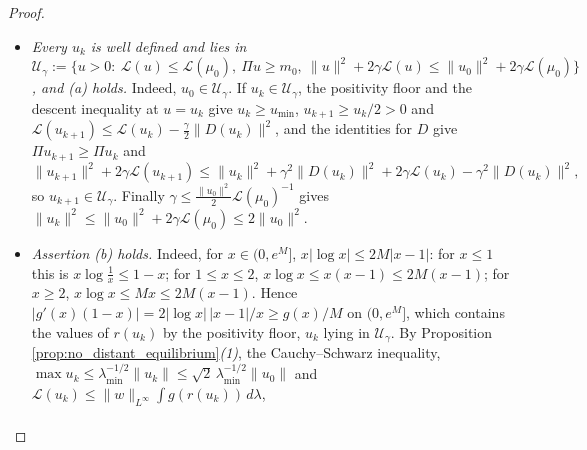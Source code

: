 \begin{proof}
\begin{itemize}
    \begin{equation*}
        f'(s)=\int w\,g'(r_s)\,\chi_s\,d\lambda,\qquad f''(s)=\int w\Bigl(g''(r_s)\,\chi_s^2-2g'(r_s)\,\frac{\chi_s\,v}{u_s}\Bigr)d\lambda,
    \end{equation*}
    and $f'(0)=\langle\psi(u),Pv-r(u)v\rangle=\langle D(u),v\rangle=-\|D(u)\|^2$. Now $|\chi_s|\leq2(P|v|+e^{M'}|v|)/u_{\min}$ pointwise and $\|P|v|\|\leq\|v\|$ by Lemma \ref{lem:adjoint}\emph{(3)}, so the triangle inequality gives $\|P|v|+e^{M'}|v|\|\leq(1+e^{M'})\|v\|$ and the Cauchy--Schwarz inequality gives $\int(P|v|+e^{M'}|v|)|v|\,d\lambda\leq(1+e^{M'})\|v\|^2$; therefore $|f''|\leq b_3\|D(u)\|^2$ on $[0,\gamma]$. Taylor's formula and $\gamma b_3\leq1$ give $\mathcal L(u^+)=f(\gamma)\leq\mathcal L(u)-\gamma\|D(u)\|^2+\frac{\gamma^2b_3}2\|D(u)\|^2\leq\mathcal L(u)-\frac\gamma2\|D(u)\|^2$, and $u^+=u_\gamma\geq u/2$.
    \item \emph{Every $u_k$ is well defined and lies in $\mathcal U_\gamma:=\bigl\{u>0:\ \mathcal L(u)\leq\mathcal L(\mu_0),\ \Pi u\geq m_0,\ \|u\|^2+2\gamma\mathcal L(u)\leq\|u_0\|^2+2\gamma\mathcal L(\mu_0)\bigr\}$, and \emph{(a)} holds.} Indeed, $u_0\in\mathcal U_\gamma$. If $u_k\in\mathcal U_\gamma$, the positivity floor and the descent inequality at $u=u_k$ give $u_k\geq u_{\min}$, $u_{k+1}\geq u_k/2>0$ and $\mathcal L(u_{k+1})\leq\mathcal L(u_k)-\frac\gamma2\|D(u_k)\|^2$, and the identities for $D$ give $\Pi u_{k+1}\geq\Pi u_k$ and
    \begin{equation*}
        \|u_{k+1}\|^2+2\gamma\mathcal L(u_{k+1})\leq\|u_k\|^2+\gamma^2\|D(u_k)\|^2+2\gamma\mathcal L(u_k)-\gamma^2\|D(u_k)\|^2,
    \end{equation*}
    so $u_{k+1}\in\mathcal U_\gamma$. Finally $\gamma\leq\frac{\|u_0\|^2}2\mathcal L(\mu_0)^{-1}$ gives $\|u_k\|^2\leq\|u_0\|^2+2\gamma\mathcal L(\mu_0)\leq2\|u_0\|^2$.
    \item \emph{Assertion \emph{(b)} holds.} Indeed, for $x\in(0,e^M]$, $x|\log x|\leq2M|x-1|$: for $x\leq1$ this is $x\log\frac1x\leq1-x$; for $1\leq x\leq2$, $x\log x\leq x(x-1)\leq2M(x-1)$; for $x\geq2$, $x\log x\leq Mx\leq2M(x-1)$. Hence $|g'(x)(1-x)|=2|\log x|\,|x-1|/x\geq g(x)/M$ on $(0,e^M]$, which contains the values of $r(u_k)$ by the positivity floor, $u_k$ lying in $\mathcal U_\gamma$. By Proposition \ref{prop:no_distant_equilibrium}\emph{(1)}, the Cauchy--Schwarz inequality, $\max u_k\leq\lambda_{\min}^{-1/2}\|u_k\|\leq\sqrt2\,\lambda_{\min}^{-1/2}\|u_0\|$ and $\mathcal L(u_k)\leq\|w\|_{L^\infty}\int g(r(u_k))\,d\lambda$,
    \begin{eqnarray*}

\end{eqnarray*}
\end{itemize}
\end{proof}

